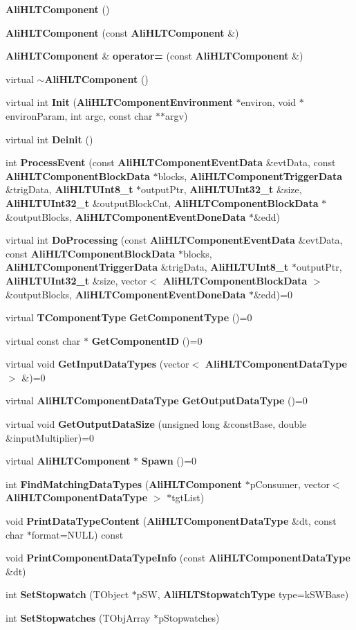 \begin{CompactItemize}
\item 
{\bf Ali\-HLTComponent} ()
\item 
{\bf Ali\-HLTComponent} (const {\bf Ali\-HLTComponent} \&)
\item 
{\bf Ali\-HLTComponent} \& {\bf operator=} (const {\bf Ali\-HLTComponent} \&)
\item 
virtual {\bf $\sim$Ali\-HLTComponent} ()
\item 
virtual int {\bf Init} ({\bf Ali\-HLTComponent\-Environment} $\ast$environ, void $\ast$environ\-Param, int argc, const char $\ast$$\ast$argv)
\item 
virtual int {\bf Deinit} ()
\item 
int {\bf Process\-Event} (const {\bf Ali\-HLTComponent\-Event\-Data} \&evt\-Data, const {\bf Ali\-HLTComponent\-Block\-Data} $\ast$blocks, {\bf Ali\-HLTComponent\-Trigger\-Data} \&trig\-Data, {\bf Ali\-HLTUInt8\_\-t} $\ast$output\-Ptr, {\bf Ali\-HLTUInt32\_\-t} \&size, {\bf Ali\-HLTUInt32\_\-t} \&output\-Block\-Cnt, {\bf Ali\-HLTComponent\-Block\-Data} $\ast$\&output\-Blocks, {\bf Ali\-HLTComponent\-Event\-Done\-Data} $\ast$\&edd)
\item 
virtual int {\bf Do\-Processing} (const {\bf Ali\-HLTComponent\-Event\-Data} \&evt\-Data, const {\bf Ali\-HLTComponent\-Block\-Data} $\ast$blocks, {\bf Ali\-HLTComponent\-Trigger\-Data} \&trig\-Data, {\bf Ali\-HLTUInt8\_\-t} $\ast$output\-Ptr, {\bf Ali\-HLTUInt32\_\-t} \&size, vector$<$ {\bf Ali\-HLTComponent\-Block\-Data} $>$ \&output\-Blocks, {\bf Ali\-HLTComponent\-Event\-Done\-Data} $\ast$\&edd)=0
\item 
virtual {\bf TComponent\-Type} {\bf Get\-Component\-Type} ()=0
\item 
virtual const char $\ast$ {\bf Get\-Component\-ID} ()=0
\item 
virtual void {\bf Get\-Input\-Data\-Types} (vector$<$ {\bf Ali\-HLTComponent\-Data\-Type} $>$ \&)=0
\item 
virtual {\bf Ali\-HLTComponent\-Data\-Type} {\bf Get\-Output\-Data\-Type} ()=0
\item 
virtual void {\bf Get\-Output\-Data\-Size} (unsigned long \&const\-Base, double \&input\-Multiplier)=0
\item 
virtual {\bf Ali\-HLTComponent} $\ast$ {\bf Spawn} ()=0
\item 
int {\bf Find\-Matching\-Data\-Types} ({\bf Ali\-HLTComponent} $\ast$p\-Consumer, vector$<$ {\bf Ali\-HLTComponent\-Data\-Type} $>$ $\ast$tgt\-List)
\item 
void {\bf Print\-Data\-Type\-Content} ({\bf Ali\-HLTComponent\-Data\-Type} \&dt, const char $\ast$format=NULL) const 
\item 
void {\bf Print\-Component\-Data\-Type\-Info} (const {\bf Ali\-HLTComponent\-Data\-Type} \&dt)
\item 
int {\bf Set\-Stopwatch} (TObject $\ast$p\-SW, {\bf Ali\-HLTStopwatch\-Type} type=k\-SWBase)
\item 
int {\bf Set\-Stopwatches} (TObj\-Array $\ast$p\-Stopwatches)
\end{CompactItemize}
